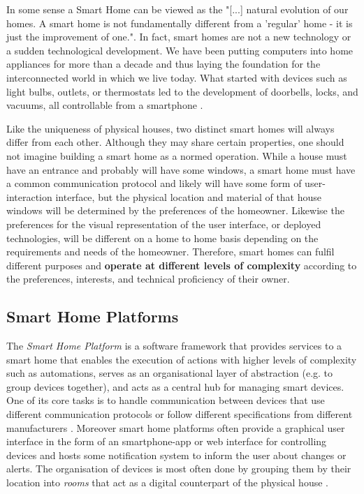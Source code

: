 In some sense a Smart Home can be viewed as the "[...] natural evolution of our homes. A smart home is not fundamentally different from a 'regular' home - it is just the improvement of one."\cite{Tuohy2023SH}. In fact, smart homes are not a new technology or a sudden technological development. We have been putting computers into home appliances for more than a decade \cite{Tuohy2023SH} and thus laying the foundation for the interconnected world in which we live today. What started with devices such as light bulbs, outlets, or thermostats led to the development of doorbells, locks, and vacuums, all controllable from a smartphone \cite{Tuohy2023SH}.

Like the uniqueness of physical houses, two distinct smart homes will always differ from each other. Although they may share certain properties, one should not imagine building a smart home as a normed operation. While a house must have an entrance and probably will have some windows, a smart home must have a common communication protocol and likely will have some form of user-interaction interface, but the physical location and material of that house windows will be determined by the preferences of the homeowner. Likewise the preferences for the visual representation of the user interface, or deployed technologies, will be different on a home to home basis depending on the requirements and needs of the homeowner. Therefore, smart homes can fulfil different purposes and \textbf{ operate at different levels of complexity} according to the preferences, interests, and technical proficiency of their owner.

\subsection{Smart Home Platforms} \label{sec:Smart Home Platforms}
The \textit{Smart Home Platform} is a software framework that provides services to a smart home that enables the execution of actions with higher levels of complexity such as automations, serves as an organisational layer of abstraction (e.g. to group devices together), and acts as a central hub for managing smart devices. One of its core tasks is to handle communication between devices that use different communication protocols \cite{ReviewOfSmartHomes-6177682} or follow different specifications from different manufacturers \cite{Tuohy2023SHP}. Moreover smart home platforms often provide a graphical user interface in the form of an smartphone-app or web interface for controlling devices and hosts some notification system to inform the user about changes or alerts. The organisation of devices is most often done by grouping them by their location into \textit{rooms} that act as a digital counterpart of the physical house \cite{BertkoChris2017HSH:}.

